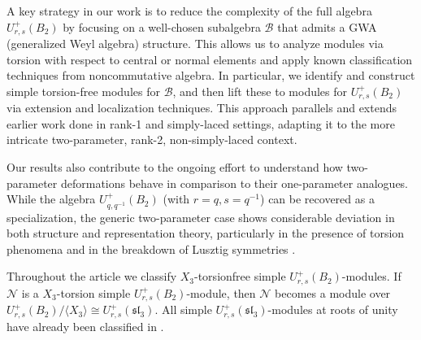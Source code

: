 \documentclass[12 pt,reqno]{amsart}
\numberwithin{equation}{section}
\newcommand{\B}{\mathcal{B}}
\theoremstyle{definition}
\theoremstyle{definition}
\theoremstyle{remark}
\theoremstyle{remark}
\begin{document}
\par A key strategy in our work is to reduce the complexity of the full algebra $ U^+_{r,s}(B_2) $ by focusing on a well-chosen subalgebra $ \B $ that admits a GWA (generalized Weyl algebra) structure. This allows us to analyze modules via torsion with respect to central or normal elements and apply known classification techniques from noncommutative algebra. In particular, we identify and construct simple torsion-free modules for $ \B $, and then lift these to modules for $ U^+_{r,s}(B_2) $ via extension and localization techniques. This approach parallels and extends earlier work done in rank-1 and simply-laced settings, adapting it to the more intricate two-parameter, rank-2, non-simply-laced context.
\par Our results also contribute to the ongoing effort to understand how two-parameter deformations behave in comparison to their one-parameter analogues. While the algebra $ U^+_{q,q^{-1}}(B_2) $ (with $ r = q, s = q^{-1} $) can be recovered as a specialization, the generic two-parameter case shows considerable deviation in both structure and representation theory, particularly in the presence of torsion phenomena and in the breakdown of Lusztig symmetries \cite{huwang}.

\par  Throughout the article we classify $X_3$-torsionfree simple $ U^+_{r,s}(B_2) $-modules. If $\mathcal{N}$ is a $X_3$-torsion simple $ U^+_{r,s}(B_2) $-module, then $\mathcal{N}$ becomes a module over $ U^+_{r,s}(B_2)/\langle X_3\rangle \cong U_{r,s}^+(\mathfrak{sl}_3) $. All simple $U_{r,s}^+(\mathfrak{sl}_3)$-modules at roots of unity have already been classified in \cite{sb}.  
\end{document}
